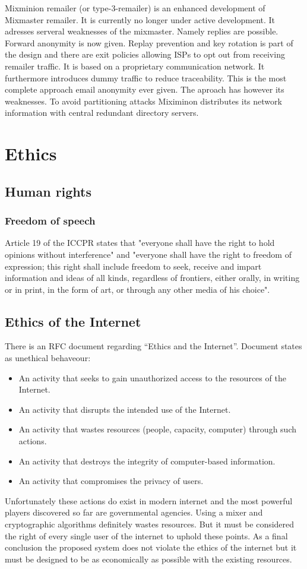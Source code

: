 Mixminion remailer (or type-3-remailer) is an enhanced development of Mixmaster remailer. It is currently no longer under active development. It adresses serveral weaknesses of the mixmaster. Namely replies are possible. Forward anonymity is now given. Replay prevention and key rotation is part of the design and there are exit policies allowing ISPs to opt out from receiving remailer traffic. It is based on a proprietary communication network. It furthermore introduces dummy traffic to reduce traceability. This is the most complete approach email anonymity ever given. The aproach has however its weaknesses. To avoid partitioning attacks Miximinon distributes its network information with central redundant directory servers.\par

\section{Ethics}
\subsection{Human rights}
\subsubsection{Freedom of speech}
Article 19 of the ICCPR states that "everyone shall have the right to hold opinions without interference" and "everyone shall have the right to freedom of expression; this right shall include freedom to seek, receive and impart information and ideas of all kinds, regardless of frontiers, either orally, in writing or in print, in the form of art, or through any other media of his choice".

\subsection{Ethics of the Internet}
There is an RFC document regarding ``Ethics and the Internet''\cite[p.~1]{RFC1087}. Document states as unethical behaveour:
\begin{itemize}
\item An activity that seeks to gain unauthorized access to the resources of the Internet.
\item An activity that disrupts the intended use of the Internet.
\item An activity that wastes resources (people, capacity, computer) through such actions.
\item An activity that destroys the integrity of computer-based information.
\item An activity that compromises the privacy of users.
\end{itemize}
Unfortunately these actions do exist in modern internet and the most powerful players discovered so far are governmental agencies. Using a mixer and cryptographic algorithms definitely wastes resources. But it must be considered the right of every single user of the internet to uphold these points. As a final conclusion the proposed system does not violate the ethics of the internet but it must be designed to be as economically as possible with the existing resources.

